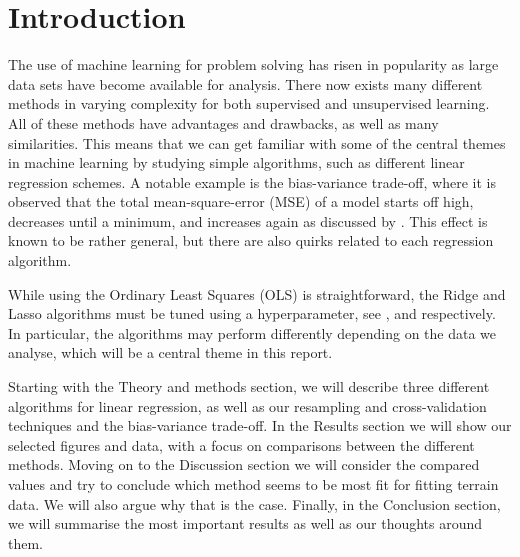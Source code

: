 \section{Introduction}
\label{sec:introduction}

The use of machine learning for problem solving has risen in popularity as large data sets have become available for analysis. There now exists many different methods in varying complexity for both supervised and unsupervised learning. All of these methods have advantages and drawbacks, as well as many similarities. This means that we can get familiar with some of the central themes in machine learning by studying simple algorithms, such as different linear regression schemes. A notable example is the bias-variance trade-off, where it is observed that the total mean-square-error (MSE) of a model starts off high, decreases until a minimum, and increases again as discussed by \citet{hastie2009elements}. This effect is known to be rather general, but there are also quirks related to each regression algorithm.

While using the Ordinary Least Squares (OLS) is straightforward, the Ridge and Lasso algorithms must be tuned using a hyperparameter, see \citet{hoerl1970ridge}, and \citet{tibshirani1996lasso} respectively. In particular, the algorithms may perform differently depending on the data we analyse, which will be a central theme in this report.

Starting with the Theory and methods section, we will describe three different algorithms for linear regression, as well as our resampling and cross-validation techniques and the bias-variance trade-off. In the Results section we will show our selected figures and data, with a focus on comparisons between the different methods. Moving on to the Discussion section we will consider the compared values and try to conclude which method seems to be most fit for fitting terrain data. We will also argue why that is the case. Finally, in the Conclusion section, we will summarise the most important results as well as our thoughts around them.